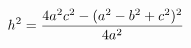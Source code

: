 \documentclass[preview]{standalone}
\begin{document}
\begin{align*}
\special{dvisvgm:raw <g id='unique000'>}h^2 = \frac{4a^2c^2 - (a^2 - b^2 + c^2)^2}{4a^2}\special{dvisvgm:raw </g>}
\end{align*}
\end{document}
